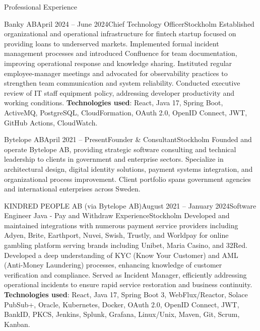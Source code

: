 \documentclass{resume}
\begin{document}
\begin{rSection}{Professional Experience}
\begin{rSubsection}{Banky AB}{April 2024 -- June 2024}{Chief Technology Officer}{Stockholm}
\bItem Established organizational and operational infrastructure for fintech startup focused on providing loans to underserved markets.
\bItem Implemented formal incident management processes and introduced Confluence for team documentation, improving operational response and knowledge sharing.
\bItem Instituted regular employee-manager meetings and advocated for observability practices to strengthen team communication and system reliability.
\bItem Conducted executive review of IT staff equipment policy, addressing developer productivity and working conditions.
\bItem \textbf{Technologies used}: React, Java 17, Spring Boot, ActiveMQ, PostgreSQL, CloudFormation, OAuth 2.0, OpenID Connect, JWT, GitHub Actions, CloudWatch.
\end{rSubsection}

\begin{rSubsection}{Bytelope AB}{April 2021 -- Present}{Founder \& Consultant}{Stockholm}
\bItem Founded and operate Bytelope AB, providing strategic software consulting and technical leadership to clients in government and enterprise sectors.
\bItem Specialize in architectural design, digital identity solutions, payment systems integration, and organizational process improvement.
\bItem Client portfolio spans government agencies and international enterprises across Sweden.
\end{rSubsection}

\begin{rClientSubsection}{KINDRED PEOPLE AB (via Bytelope AB)}{August 2021 -- January 2024}{Software Engineer Java - Pay and Withdraw Experience}{Stockholm}
\bItem Developed and maintained integrations with numerous payment service providers including Adyen, Brite, Earthport, Nuvei, Swish, Trustly, and Worldpay for online gambling platform serving brands including Unibet, Maria Casino, and 32Red.
\bItem Developed a deep understanding of KYC (Know Your Customer) and AML (Anti-Money Laundering) processes, enhancing knowledge of customer verification and compliance.
\bItem Served as Incident Manager, efficiently addressing operational incidents to ensure rapid service restoration and business continuity.
\bItem \textbf{Technologies used}: React, Java 17, Spring Boot 3, WebFlux/Reactor, Solace PubSub+, Oracle, Kubernetes, Docker, OAuth 2.0, OpenID Connect, JWT, BankID, PKCS, Jenkins, Splunk, Grafana, Linux/Unix, Maven, Git, Scrum, Kanban.
\end{rClientSubsection}


\end{rSection}
\end{document}
